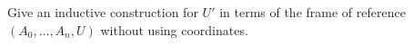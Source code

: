 Give an inductive construction for $U'$ in terms of the frame of reference $(A_0, \ldots, A_n, U)$ without using coordinates.
